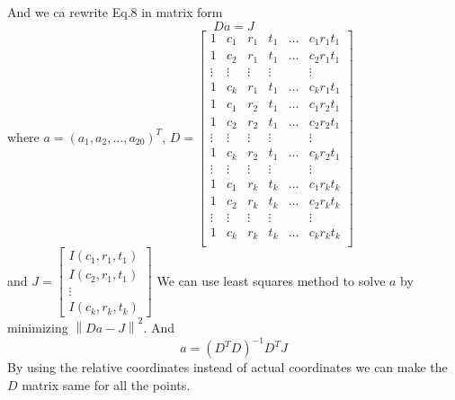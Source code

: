 \documentclass{article}
\begin{document}
And we ca rewrite Eq.8 in matrix form 
\begin{equation}
Da=J
\end{equation}
where $a=(a_1,a_2,\dots,a_{20})^T$, $D=\begin{bmatrix}1&c_1&r_1&t_1&\dots&c_1r_1t_1\\
1&c_2&r_1&t_1&\dots&c_2r_1t_1\\
\vdots&\vdots&\vdots&\vdots& &\vdots\\
1&c_k&r_1&t_1&\dots&c_kr_1t_1\\
1&c_1&r_2&t_1&\dots&c_1r_2t_1\\
1&c_2&r_2&t_1&\dots&c_2r_2t_1\\
\vdots&\vdots&\vdots&\vdots& &\vdots\\
1&c_k&r_2&t_1&\dots&c_kr_2t_1\\
\vdots&\vdots&\vdots&\vdots& &\vdots\\
1&c_1&r_k&t_k&\dots&c_1r_kt_k\\
1&c_2&r_k&t_k&\dots&c_2r_kt_k\\
\vdots&\vdots&\vdots&\vdots& &\vdots\\
1&c_k&r_k&t_k&\dots&c_kr_kt_k\\
\end{bmatrix}$\\
and $J=\begin{bmatrix}
I(c_1,r_1,t_1)\\
I(c_2,r_1,t_1)\\
\vdots\\
I(c_k,r_k,t_k)
\end{bmatrix}$
We can use least squares method to solve $a$ by minimizing $\left\|Da-J\right\|^2$. And 
\begin{equation}
a=(D^TD)^{-1}D^TJ
\end{equation}
By using the relative coordinates instead of actual coordinates we can make the $D$ matrix same for all the points.
\end{document}
